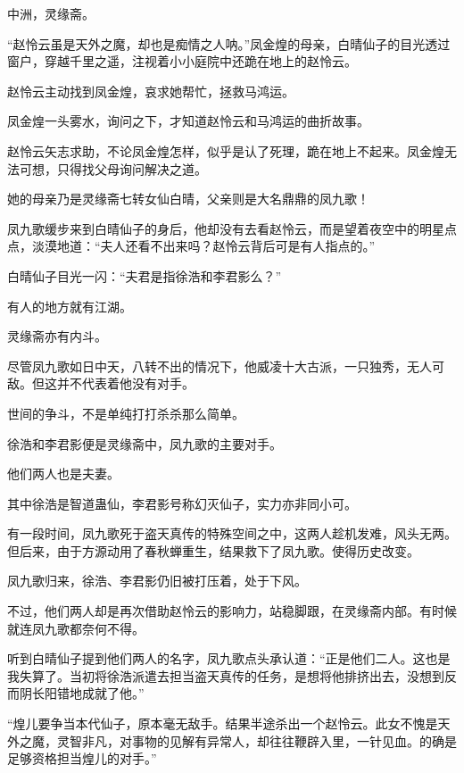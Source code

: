 
\begin{this_body}



中洲，灵缘斋。

“赵怜云虽是天外之魔，却也是痴情之人呐。”凤金煌的母亲，白晴仙子的目光透过窗户，穿越千里之遥，注视着小小庭院中还跪在地上的赵怜云。

赵怜云主动找到凤金煌，哀求她帮忙，拯救马鸿运。

凤金煌一头雾水，询问之下，才知道赵怜云和马鸿运的曲折故事。

赵怜云矢志求助，不论凤金煌怎样，似乎是认了死理，跪在地上不起来。凤金煌无法可想，只得找父母询问解决之道。

她的母亲乃是灵缘斋七转女仙白晴，父亲则是大名鼎鼎的凤九歌！

凤九歌缓步来到白晴仙子的身后，他却没有去看赵怜云，而是望着夜空中的明星点点，淡漠地道：“夫人还看不出来吗？赵怜云背后可是有人指点的。”

白晴仙子目光一闪：“夫君是指徐浩和李君影么？”

有人的地方就有江湖。

灵缘斋亦有内斗。

尽管凤九歌如日中天，八转不出的情况下，他威凌十大古派，一只独秀，无人可敌。但这并不代表着他没有对手。

世间的争斗，不是单纯打打杀杀那么简单。

徐浩和李君影便是灵缘斋中，凤九歌的主要对手。

他们两人也是夫妻。

其中徐浩是智道蛊仙，李君影号称幻灭仙子，实力亦非同小可。

有一段时间，凤九歌死于盗天真传的特殊空间之中，这两人趁机发难，风头无两。但后来，由于方源动用了春秋蝉重生，结果救下了凤九歌。使得历史改变。

凤九歌归来，徐浩、李君影仍旧被打压着，处于下风。

不过，他们两人却是再次借助赵怜云的影响力，站稳脚跟，在灵缘斋内部。有时候就连凤九歌都奈何不得。

听到白晴仙子提到他们两人的名字，凤九歌点头承认道：“正是他们二人。这也是我失算了。当初将徐浩派遣去担当盗天真传的任务，是想将他排挤出去，没想到反而阴长阳错地成就了他。”

“煌儿要争当本代仙子，原本毫无敌手。结果半途杀出一个赵怜云。此女不愧是天外之魔，灵智非凡，对事物的见解有异常人，却往往鞭辟入里，一针见血。的确是足够资格担当煌儿的对手。”


\end{this_body}
